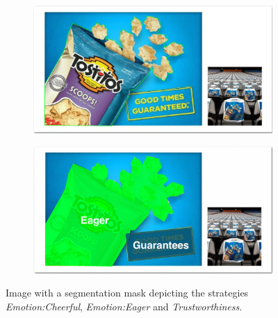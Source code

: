 \begin{figure}[!h]
     \begin{subfigure}[b]{0.4\textwidth}
         \includegraphics[scale=0.22]{images/Image4.png}
     \end{subfigure}
     \begin{subfigure}[b]{0.4\textwidth}
         \includegraphics[scale=0.22]{images/Image4_Segment.png}
     \end{subfigure}
     
    \caption{\small \label{fig:segmented image} Image with a segmentation mask depicting the strategies \textit{Emotion:Cheerful}, \textit{Emotion:Eager} and \textit{Trustworthiness}.}
\end{figure}







